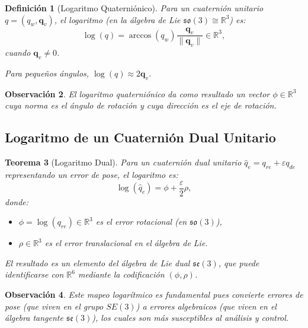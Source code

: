 \documentclass[11pt,a4paper]{article}
\newtheorem{theorem}{Teorema}[section]
\newtheorem{definition}[theorem]{Definición}
\newtheorem{remark}[theorem]{Observación}
\begin{document}
\begin{definition}[Logaritmo Quaterniónico]
Para un cuaternión unitario $q = (q_w, \mathbf{q}_v)$, el logaritmo (en la álgebra de Lie $\mathfrak{so}(3) \cong \mathbb{R}^3$) es:
\begin{equation}
    \log(q) = \arccos(q_w) \frac{\mathbf{q}_v}{\|\mathbf{q}_v\|} \in \mathbb{R}^3,
\end{equation}
cuando $\mathbf{q}_v \neq 0$.

Para pequeños ángulos, $\log(q) \approx 2\mathbf{q}_v$.
\end{definition}

\begin{remark}
El logaritmo quaterniónico da como resultado un vector $\phi \in \mathbb{R}^3$ cuya norma es el ángulo de rotación y cuya dirección es el eje de rotación.
\end{remark}

\subsection{Logaritmo de un Cuaternión Dual Unitario}

\begin{theorem}[Logaritmo Dual]
Para un cuaternión dual unitario $\hat{q}_e = q_{re} + \varepsilon q_{de}$ representando un error de pose, el logaritmo es:
\begin{equation}
    \log(\hat{q}_e) = \phi + \frac{\varepsilon}{2} \rho,
\end{equation}
donde:
\begin{itemize}
    \item $\phi = \log(q_{re}) \in \mathbb{R}^3$ es el error rotacional (en $\mathfrak{so}(3)$),
    \item $\rho \in \mathbb{R}^3$ es el error translacional en el álgebra de Lie.
\end{itemize}

El resultado es un elemento del álgebra de Lie dual $\mathfrak{se}(3)$, que puede identificarse con $\mathbb{R}^6$ mediante la codificación $(\phi, \rho)$.
\end{theorem}

\begin{remark}
Este mapeo logarítmico es fundamental pues convierte errores de pose (que viven en el grupo $SE(3)$) a errores algebraicos (que viven en el álgebra tangente $\mathfrak{se}(3)$), los cuales son más susceptibles al análisis y control.
\end{remark}
\end{document}

